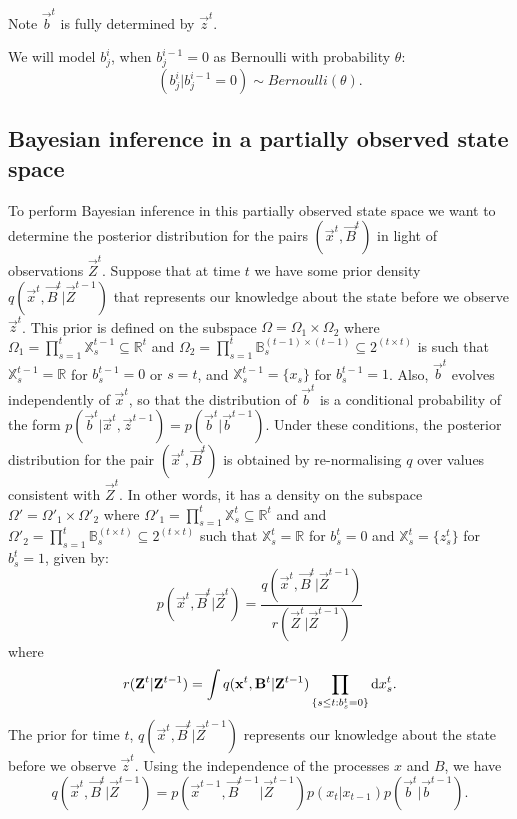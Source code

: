Note $\vec{b}^{t}$ is fully determined by $\vec{z}^{t}$.

We will model $b_j^{i}$, when $b_j^{i-1} = 0$ as Bernoulli with probability $\theta$:
\begin{equation*}
    (b_j^{i} | b_j^{i-1} = 0) \sim Bernoulli(\theta).
\end{equation*}

\subsection{Bayesian inference in a partially observed state space}
\label{sec:4}

To perform Bayesian inference in this partially observed state space we want to determine the posterior distribution for the pairs $(\vec{x}^{t}, \vec{B}^{t})$ in light of observations $\vec{Z}^{t}$. Suppose that at time $t$ we have some prior density $q(\vec{x}^{t},\vec{B}^{t} | \vec{Z}^{t-1})$ that represents our knowledge about the state before we observe $\vec{z}^{t}$. This prior is defined on the subspace $\Omega = \Omega_1 \times \Omega_2$ where $\Omega_1 = \prod_{s=1}^t \mathbb{X}_s^{t-1} \subseteq \mathbb{R}^t$ and $\Omega_2 = \prod_{s=1}^t \mathbb{B}_s^{(t-1) \times (t-1)} \subseteq 2^{(t \times t)}$ is such that $\mathbb{X}_s^{t-1} = \mathbb{R}$ for $b_s^{t-1} = 0$ or $s=t$, and $\mathbb{X}_s^{t-1} = \{ x_s \}$ for $b_s^{t-1} = 1$. Also, $\vec{b}^{t}$ evolves independently of $\vec{x}^{t}$, so that the distribution of $\vec{b}^{t}$ is a conditional probability of the form $p(\vec{b}^{t} | \vec{x}^{t}, \vec{z}^{t-1} ) = p( \vec{b}^{t} | \vec{b}^{t-1} )$. Under these conditions, the posterior distribution for the pair $(\vec{x}^{t}, \vec{B}^{t})$ is obtained by re-normalising $q$ over values consistent with $\vec{Z}^{t}$. In other words, it has a density on the subspace $\Omega' = \Omega'_1 \times \Omega'_2$ where $\Omega'_1 = \prod_{s=1}^t \mathbb{X}_s^{t} \subseteq \mathbb{R}^t$ and and $\Omega'_2 = \prod_{s=1}^t \mathbb{B}_s^{(t \times t)} \subseteq 2^{(t \times t)}$ such that $\mathbb{X}_s^{t} = \mathbb{R}$ for $b_s^{t} = 0$ and $\mathbb{X}_s^{t} = \{ z_s^{t}\}$ for $b_s^{t} = 1$, given by:
\begin{equation*}
    p(\vec{x}^{t}, \vec{B}^{t} | \vec{Z}^{t}) = \frac{ q(\vec{x}^{t}, \vec{B}^{t}|\vec{Z}^{t-1})} {r(\vec{Z}^{t} | \vec{Z}^{t-1})}
\end{equation*}
where 
\begin{equation*}
    r(\mathbf{Z}^{t} | \mathbf{Z}^{t-1}) = \int q(\mathbf{x}^{t}, \mathbf{B}^{t}|\mathbf{Z}^{t-1}) \prod_{\{s \leq t: b_s^{t} = 0\}} \mathrm{d} x_s^{t}.
\end{equation*}
The prior for time $t$, $q(\vec{x}^{t},\vec{B}^{t} | \vec{Z}^{t-1})$ represents our knowledge about the state before we observe $\vec{z}^{t}$. Using the independence of the processes $x$ and $B$, we have
\begin{equation}
    q(\vec{x}^{t},\vec{B}^{t} | \vec{Z}^{t-1}) = p(\vec{x}^{t-1},\vec{B}^{t-1} | \vec{Z}^{t-1}) p(x_t | x_{t-1}) p(\vec{b}^{t} | \vec{b}^{t-1}).
    \label{eq:1}
\end{equation}

